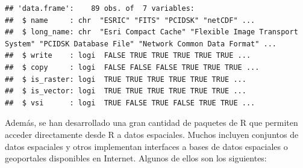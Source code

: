 \documentclass[
  spanish,
]{book}
\theoremstyle{break}
\begin{document}
\begin{verbatim}
## 'data.frame':    89 obs. of  7 variables:
##  $ name     : chr  "ESRIC" "FITS" "PCIDSK" "netCDF" ...
##  $ long_name: chr  "Esri Compact Cache" "Flexible Image Transport System" "PCIDSK Database File" "Network Common Data Format" ...
##  $ write    : logi  FALSE TRUE TRUE TRUE TRUE TRUE ...
##  $ copy     : logi  FALSE FALSE FALSE TRUE TRUE TRUE ...
##  $ is_raster: logi  TRUE TRUE TRUE TRUE TRUE TRUE ...
##  $ is_vector: logi  TRUE TRUE TRUE TRUE TRUE TRUE ...
##  $ vsi      : logi  TRUE FALSE TRUE FALSE TRUE TRUE ...
\end{verbatim}

Además, se han desarrollado una gran cantidad de paquetes de R que permiten acceder directamente desde R a datos espaciales.
Muchos incluyen conjuntos de datos espaciales y otros implementan interfaces a bases de datos espaciales o geoportales disponibles en Internet.
Algunos de ellos son los siguientes:
\end{document}

